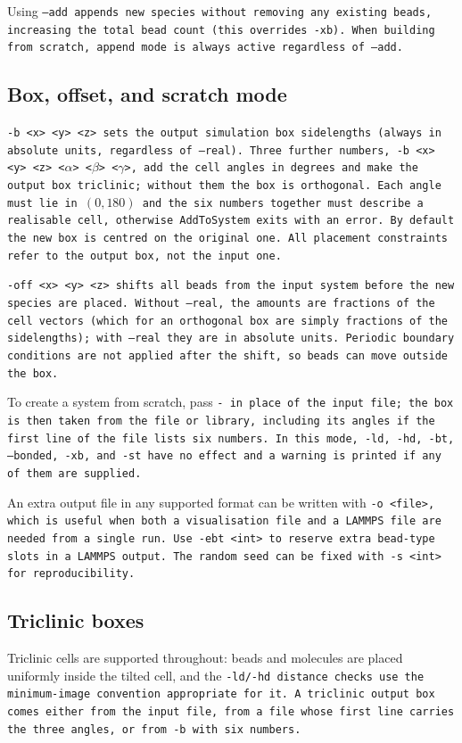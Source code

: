 Using \tt{--add} appends new species without removing any existing beads,
increasing the total bead count (this overrides \tt{-xb}). When building from
scratch, append mode is always active regardless of \tt{--add}.

\subsection{Box, offset, and scratch mode}

\tt{-b <x> <y> <z>} sets the output simulation box sidelengths (always in
absolute units, regardless of \tt{--real}). Three further numbers,
\tt{-b <x> <y> <z> <$\alpha$> <$\beta$> <$\gamma$>}, add the cell angles in
degrees and make the output box triclinic; without them the box is orthogonal.
Each angle must lie in $(0,180)$ and the six numbers together must describe a
realisable cell, otherwise \tt{AddToSystem} exits with an error. By default the
new box is centred on the original one. All placement constraints refer to the
output box, not the input one.

\tt{-off <x> <y> <z>} shifts all beads from the input system before the new
species are placed. Without \tt{--real}, the amounts are fractions of the cell
vectors (which for an orthogonal box are simply fractions of the sidelengths);
with \tt{--real} they are in absolute units. Periodic boundary conditions are
not applied after the shift, so beads can move outside the box.

To create a system from scratch, pass \tt{-} in place of the input file; the
box is then taken from the \field file or library, including its angles if the
first line of the \field file lists six numbers. In this mode, \tt{-ld},
\tt{-hd}, \tt{-bt}, \tt{--bonded}, \tt{-xb}, and \tt{-st} have no effect and
a warning is printed if any of them are supplied.

An extra output file in any supported format can be written with \tt{-o
<file>}, which is useful when both a \vtf visualisation file and a \data
LAMMPS file are needed from a single run. Use \tt{-ebt <int>} to reserve
extra bead-type slots in a LAMMPS \data output. The random seed can be fixed
with \tt{-s <int>} for reproducibility.

\subsection{Triclinic boxes} \label{subsec:AddToSystem-triclinic}

Triclinic cells are supported throughout: beads and molecules are placed
uniformly inside the tilted cell, and the \tt{-ld}/\tt{-hd} distance checks use
the minimum-image convention appropriate for it. A triclinic output box comes
either from the input file, from a \field file whose first line carries the
three angles, or from \tt{-b} with six numbers.

